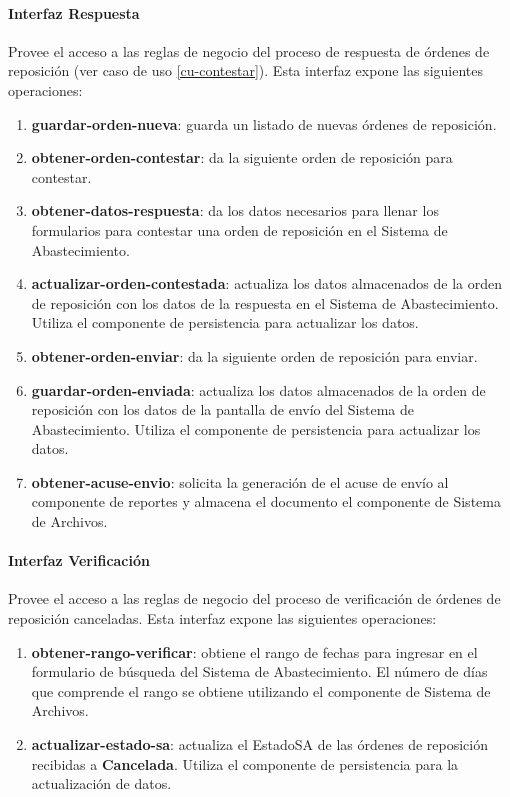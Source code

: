 \paragraph{Interfaz Respuesta\\}
Provee el acceso a las reglas de negocio del proceso de respuesta de órdenes de reposición (ver caso de uso \ref{cu-contestar}). Esta interfaz expone las siguientes operaciones:
\begin{enumerate}
	\item \textbf{guardar-orden-nueva}: guarda un listado de nuevas órdenes de reposición.
	\item \textbf{obtener-orden-contestar}: da la siguiente orden de reposición para contestar.
	\item \textbf{obtener-datos-respuesta}: da los datos necesarios para llenar los formularios para contestar una orden de reposición en el Sistema de Abastecimiento.
	\item \textbf{actualizar-orden-contestada}: actualiza los datos almacenados de la orden de reposición con los datos de la respuesta en el  Sistema de Abastecimiento. Utiliza el componente de persistencia para actualizar los datos.
	\item \textbf{obtener-orden-enviar}: da la siguiente orden de reposición para enviar.
	\item \textbf{guardar-orden-enviada}: actualiza los datos almacenados de la orden de reposición con los datos de la pantalla de envío del Sistema de Abastecimiento. Utiliza el componente de persistencia para actualizar los datos.
	\item \textbf{obtener-acuse-envio}: solicita la generación de el acuse de envío al componente de reportes y almacena el documento el componente de Sistema de Archivos.
\end{enumerate}

\paragraph{Interfaz Verificación\\}
Provee el acceso a las reglas de negocio del proceso de verificación de órdenes de reposición canceladas. Esta interfaz expone las siguientes operaciones:
\begin{enumerate}
	\item \textbf{obtener-rango-verificar}: obtiene el rango de fechas para ingresar en el formulario de búsqueda del Sistema de Abastecimiento. El número de días que comprende el rango se obtiene utilizando el componente de Sistema de Archivos.
	\item \textbf{actualizar-estado-sa}: actualiza el EstadoSA de las órdenes de reposición recibidas a \textbf{Cancelada}. Utiliza el componente de persistencia para la actualización de datos.
\end{enumerate}

